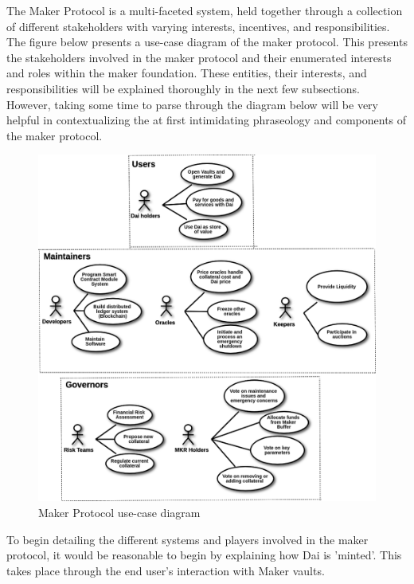 \documentclass[bsc,frontabs,singlespacing,parskip,deptreport]{infthesis}
\begin{document}
    \smallbreak
    \noindent
    The Maker Protocol is a multi-faceted system, held together through a collection of different stakeholders with varying interests, incentives, and responsibilities. The figure below presents a use-case diagram of the maker protocol. This presents the stakeholders involved in the maker protocol and their enumerated interests and roles within the maker foundation. These entities, their interests, and responsibilities will be explained thoroughly in the next few subsections. However, taking some time to parse through the diagram below will be very helpful in contextualizing the at first intimidating phraseology and components of the maker protocol. 
    \smallbreak
    \begin{figure}[h]
            \centering
         \includegraphics[width=\linewidth]{Images and Figures/Use Case Diagram.png}
              \caption{Maker Protocol use-case diagram}
    \end{figure}
    \smallbreak \noindent
    To begin detailing the different systems and players involved in the maker protocol, it would be reasonable to begin by explaining how Dai is 'minted'. This takes place through the end user's interaction with Maker vaults.  
\end{document}
